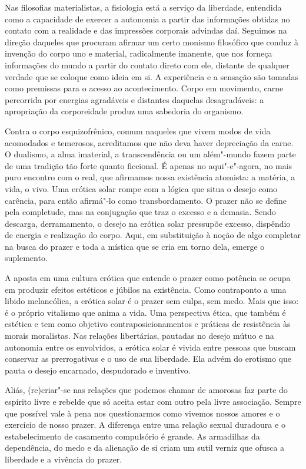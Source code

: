 Nas filosofias materialistas, a fisiologia está a serviço da liberdade,
entendida como a capacidade de exercer a autonomia a partir das
informações obtidas no contato com a realidade e das impressões
corporais advindas daí. Seguimos na direção daqueles que procuram
afirmar um certo monismo filosófico que conduz à invenção do corpo uno e
material, radicalmente imanente, que nos forneça informações do mundo a
partir do contato direto com ele, distante de qualquer verdade que se
coloque como ideia em si. A experiência e a sensação são tomadas como
premissas para o acesso ao acontecimento. Corpo em movimento, carne
percorrida por energias agradáveis e distantes daquelas desagradáveis: a
apropriação da corporeidade produz uma sabedoria do organismo.

Contra o corpo esquizofrênico, comum naqueles que vivem modos de vida
acomodados e temerosos, acreditamos que não deva haver depreciação da
carne. O dualismo, a alma imaterial, a transcendência ou um além"-mundo
fazem parte de uma tradição tão forte quanto ficcional. É apenas no aqui"-e"-agora, no mais puro encontro com o real, que afirmamos nossa
existência atomista: a matéria, a vida, o vivo. Uma erótica solar rompe
com a lógica que situa o desejo como carência, para então afirmá"-lo como
transbordamento. O prazer não se define pela completude, mas na
conjugação que traz o excesso e a demasia. Sendo descarga, derramamento,
o desejo na erótica solar pressupõe excesso, dispêndio de energia e
realização do corpo. Aqui, em substituição à noção de algo completar na %
busca do prazer e toda a mística que se cria em torno dela, emerge o
suplemento.

A aposta em uma cultura erótica que entende o prazer como potência se
ocupa em produzir efeitos estéticos e júbilos na existência. Como
contraponto a uma libido melancólica, a erótica solar é o prazer sem
culpa, sem medo. Mais que isso: é o próprio vitalismo que anima a vida.
Uma perspectiva ética, que também é estética e tem como objetivo
contraposicionamentos e práticas de resistência às morais moralistas.
Nas relações libertárias, pautadas no desejo mútuo e na autonomia entre
os envolvidos, a erótica solar é vivida entre pessoas que buscam
conservar as prerrogativas e o uso de sua liberdade. Ela advém do
erotismo que pauta o desejo encarnado, despudorado e inventivo.

Aliás, (re)criar"-se nas relações que podemos chamar de amorosas faz
parte do espírito livre e rebelde que só aceita estar com outro pela
livre associação. Sempre que possível vale à pena nos questionarmos como
vivemos nossos amores e o exercício de nosso prazer. A diferença entre
uma relação sexual duradoura e o estabelecimento de casamento
compulsório é grande. As armadilhas da dependência, do medo e da
alienação de si criam um sutil verniz que ofusca a liberdade e a
vivência do prazer.

